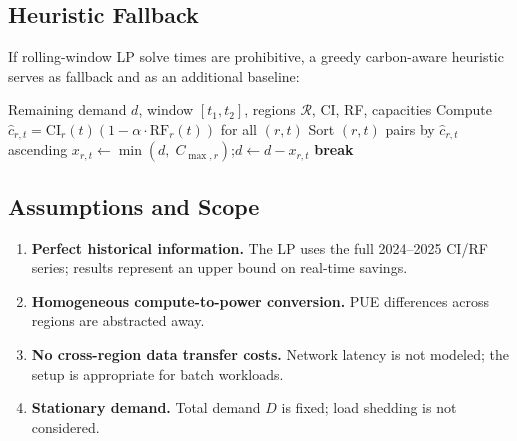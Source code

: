 \subsection{Heuristic Fallback}

If rolling-window LP solve times are prohibitive, a greedy carbon-aware heuristic serves as fallback and as an additional baseline:

\begin{algorithm}
\caption{Greedy Carbon-Aware Shifting}
\begin{algorithmic}[1]
\REQUIRE Remaining demand $d$, window $[t_1, t_2]$, regions $\mathcal{R}$, CI, RF, capacities
\STATE Compute $\hat{c}_{r,t} = \mathrm{CI}_r(t)(1 - \alpha \cdot \mathrm{RF}_r(t))$ for all $(r,t)$
\STATE Sort $(r,t)$ pairs by $\hat{c}_{r,t}$ ascending
  \STATE $x_{r,t} \leftarrow \min(d,\; C_{\max,r})$;\quad $d \leftarrow d - x_{r,t}$
   \STATE \textbf{break} \ENDIF
\ENDFOR
\end{algorithmic}
\end{algorithm}

\subsection{Assumptions and Scope}

\begin{enumerate}[leftmargin=1.5em]
  \item \textbf{Perfect historical information.} The LP uses the full 2024--2025 CI/RF series; results represent an upper bound on real-time savings.
  \item \textbf{Homogeneous compute-to-power conversion.} PUE differences across regions are abstracted away.
  \item \textbf{No cross-region data transfer costs.} Network latency is not modeled; the setup is appropriate for batch workloads.
  \item \textbf{Stationary demand.} Total demand $D$ is fixed; load shedding is not considered.
\end{enumerate}
